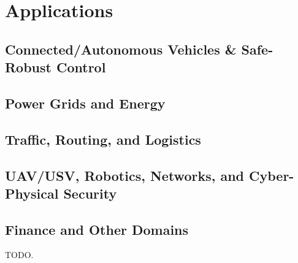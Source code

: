 \section{Applications}
\label{sec:applications}

\subsection{Connected/Autonomous Vehicles \& Safe-Robust Control}
\subsection{Power Grids and Energy}
\subsection{Traffic, Routing, and Logistics}
\subsection{UAV/USV, Robotics, Networks, and Cyber-Physical Security}
\subsection{Finance and Other Domains}
TODO.

